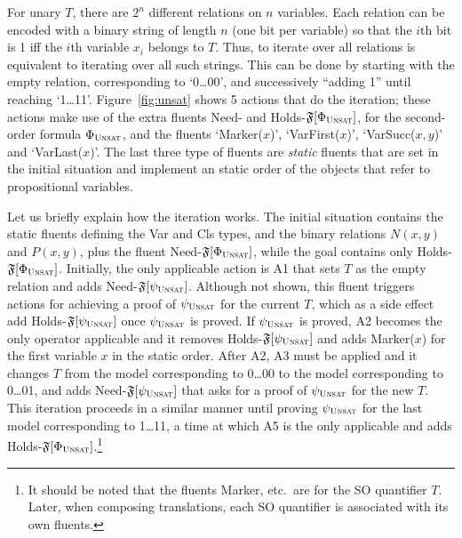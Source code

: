 For unary $T$, there are $2^n$ different relations on $n$
variables. Each relation can be encoded with a binary string
of length $n$ (one bit per variable) so that the $i$th bit
is 1 iff the $i$th variable $x_i$ belongs to $T$.
Thus, to iterate over all relations is equivalent to iterating over
all such strings. This can be done by starting with the empty
relation, corresponding to `0\ldots00', and successively
``adding 1'' until reaching `1\ldots11'.
Figure~\ref{fig:unsat} shows 5 actions that do the iteration;
these actions make use of the extra fluents Need- and
Holds-$\mathfrak{F}[\Phi_{\textsc{Unsat}}]$, for the second-order formula
$\Phi_{\textsc{Unsat}}$, and the fluents `Marker($x$)',
`VarFirst($x$)', `VarSucc($x,y$)' and `VarLast($x$)'.
The last three type of fluents are \emph{static} fluents
that are set in the initial situation and implement an
static order of the objects that refer to propositional
variables.

Let us briefly explain how the iteration works.
The initial situation contains
the static fluents defining the Var and Cls types,
and the binary relations $N(x,y)$ and $P(x,y)$, plus
the fluent Need-$\mathfrak{F}[\Phi_{\textsc{Unsat}}]$, while the goal
contains only Holds-$\mathfrak{F}[\Phi_{\textsc{Unsat}}]$.
Initially, the only applicable action is A1 that
sets $T$ as the empty relation and adds 
Need-$\mathfrak{F}[\psi_{\textsc{Unsat}}]$.
Although not shown, this fluent triggers actions
for achieving a proof of $\psi_{\textsc{Unsat}}$ for the
current $T$, which as a side effect add 
Holds-$\mathfrak{F}[\psi_{\textsc{Unsat}}]$ once $\psi_{\textsc{Unsat}}$
is proved.
If $\psi_{\textsc{Unsat}}$ is proved, A2 becomes the only operator
applicable and it removes
Holds-$\mathfrak{F}[\psi_{\textsc{Unsat}}]$ and adds Marker($x$) for the
first variable $x$ in the static order.
After A2, A3 must be applied and it
changes $T$
from the model corresponding to 0\ldots00 to the
model corresponding to 0\ldots01, and adds 
Need-$\mathfrak{F}[\psi_{\textsc{Unsat}}]$ that asks for a proof
of $\psi_{\textsc{Unsat}}$ for the new $T$.
This iteration proceeds in a similar manner until
proving $\psi_{\textsc{Unsat}}$ for the last model corresponding
to 1\ldots11, a time at which A5 is the only applicable
and adds Holds-$\mathfrak{F}[\Phi_{\textsc{Unsat}}]$.\footnote{It
should be noted that the fluents Marker, etc.\
are for the SO quantifier $T$. Later, when composing
translations, each SO quantifier is associated with
its own fluents.}


